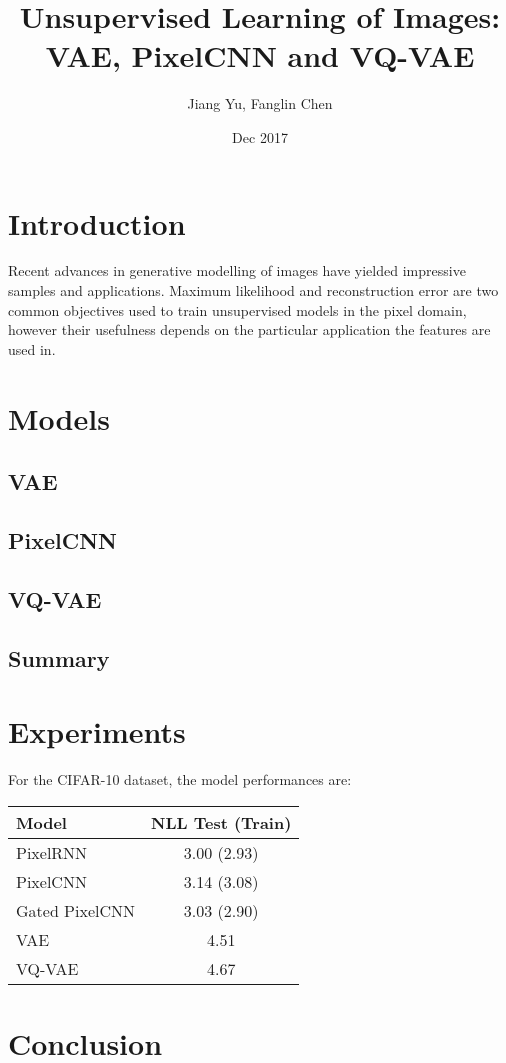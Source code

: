 \documentclass[11pt,a4paper]{article}
\begin{document}
\title{Unsupervised Learning of Images:\\VAE, PixelCNN and VQ-VAE}
\author{Jiang Yu, Fanglin Chen}
\date{Dec 2017}
\maketitle

\section{Introduction}
Recent advances in generative modelling of images have yielded impressive samples and applications. Maximum likelihood and reconstruction error are two common objectives used to train unsupervised models in the pixel domain, however their usefulness depends on the particular application the features are used in.

\section{Models}
\subsection{VAE}
\subsection{PixelCNN}
\subsection{VQ-VAE}
\subsection{Summary}

\section{Experiments}
For the CIFAR-10 dataset, the model performances are:\\
\begin{tabular}{lc}
	\hline Model & NLL Test (Train) \\
	\hline PixelRNN & 3.00 (2.93) \\
	\hline PixelCNN & 3.14 (3.08) \\
	\hline Gated PixelCNN & 3.03 (2.90) \\
	\hline VAE & 4.51 \\
	\hline VQ-VAE & 4.67 \\
	\hline 
\end{tabular}

\section{Conclusion}
\end{document}
